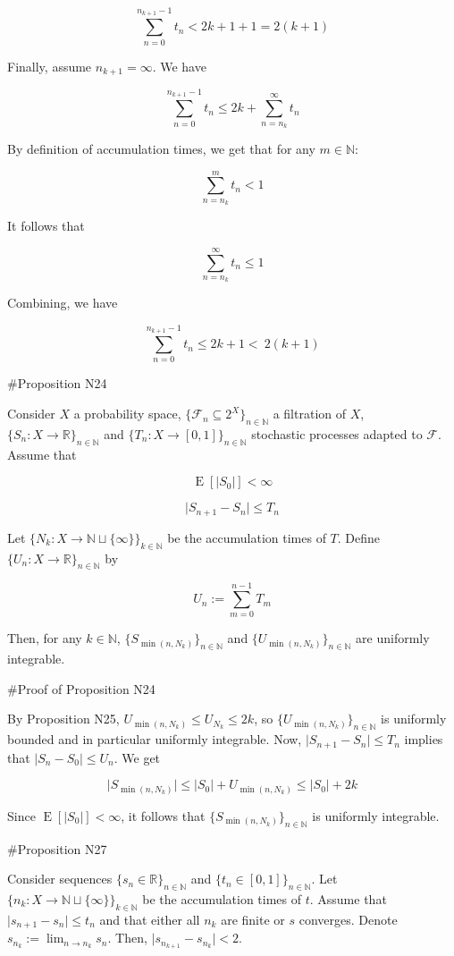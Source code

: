\documentclass[a4paper]{article}
\DeclareMathOperator{\E}{E}
\newcommand{\Nats}{\mathbb{N}}
\newcommand{\Reals}{\mathbb{R}}
\newcommand{\Sq}[2]{\{#1\}_{#2 \in \Nats}}
\newcommand{\Sqn}[1]{\Sq{#1}{n}}
\newcommand{\Abs}[1]{\lvert #1 \rvert}
\newcommand{\F}{\mathcal{F}}
\begin{document}
$$\sum_{n = 0}^{n_{k+1} - 1} t_n < 2k + 1 + 1 = 2(k+1)$$

Finally, assume ${n_{k+1} = \infty}$. We have

$$\sum_{n = 0}^{n_{k+1} - 1} t_n \leq 2k + \sum_{n = n_k}^{\infty} t_n$$

By definition of accumulation times, we get that for any ${m \in \Nats}$:

$$\sum_{n = n_k}^{m} t_n < 1$$

It follows that

$$\sum_{n = n_k}^{\infty} t_n \leq 1$$

Combining, we have

$$\sum_{n = 0}^{n_{k+1} - 1} t_n \leq 2k+1 <\ 2(k+1)$$

\#Proposition N24

Consider ${X}$ a probability space, ${\{\F_n \subseteq 2^X\}_{n \in \Nats}}$ a filtration of ${X}$, ${\{S_n:X \rightarrow \Reals\}_{n \in \Nats}}$ and ${\{T_n:X \rightarrow [0,1]\}_{n \in \Nats}}$ stochastic processes adapted to ${\F}$. Assume that

$$\E[\Abs{S_0}] < \infty$$

$$\Abs{S_{n+1}-S_n} \leq T_n$$

Let ${\{N_k: X \rightarrow \Nats \sqcup \{\infty\}\}_{k \in \Nats}}$ be the accumulation times of ${T}$. Define ${\Sqn{U_n: X \rightarrow \Reals}}$ by

$$U_n := \sum_{m=0}^{n-1} T_m$$

Then, for any ${k \in \Nats}$, ${\Sqn{S_{\min(n,N_k)}}}$ and ${\Sqn{U_{\min(n,N_k)}}}$ are uniformly integrable.

\#Proof of Proposition N24

By Proposition N25, $U_{\min(n,N_k)} \leq U_{N_k} \leq 2k$, so ${\Sqn{U_{\min(n,N_k)}}}$ is uniformly bounded and in particular uniformly integrable. Now, $\Abs{S_{n+1}-S_n} \leq T_n$ implies that ${\Abs{S_{n}-S_0} \leq U_n}$. We get

$$\Abs{S_{\min(n,N_k)}} \leq \Abs{S_0} + U_{\min(n,N_k)} \leq \Abs{S_0} + 2k$$

Since ${\E[\Abs{S_0}] < \infty}$, it follows that ${\Sqn{S_{\min(n,N_k)}}}$ is uniformly integrable.

\#Proposition N27

Consider sequences ${\Sqn{s_n \in \Reals}}$ and ${\Sqn{t_n \in [0,1]}}$. Let ${\{n_k: X \rightarrow \Nats \sqcup \{\infty\}\}_{k \in \Nats}}$ be the accumulation times of ${t}$. Assume that ${\Abs{s_{n+1} - s_n} \leq t_n}$ and that either all ${n_{k}}$ are finite or $s$ converges. Denote $s_{n_k}:=\lim_{n \rightarrow n_k} s_n$. Then, ${\Abs{s_{n_{k+1}}-s_{n_k}} < 2}$.
\end{document}
